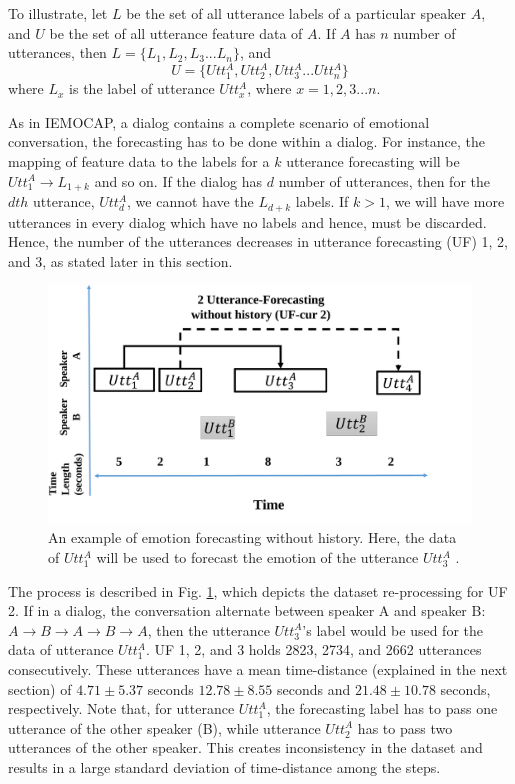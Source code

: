 To illustrate, let $L$ be the set of all utterance labels of a particular speaker $A$, and $U$ be the set of all utterance feature data of $A$. If $A$ has $n$ number of utterances, then
$L=\{L_1,L_2,L_3...L_n\}$, 
and
\[
U=\{Utt_{1}^A, Utt_{2}^A, Utt_{3}^A...Utt_{n}^A\}
\]
 where $L_x$ is the label of  utterance $Utt_{x}^A$, where $x=1,2,3...n$.

 As in IEMOCAP, a dialog contains a complete scenario of emotional conversation, the forecasting has to be done within a dialog.    For instance,  the mapping of feature data  to the labels for a $k$ utterance forecasting will be $Utt_{1}^A \rightarrow L_{1+k}$ and so on. If the dialog has $d$ number of utterances, then for the $dth$ utterance, $Utt_{d}^A$, we cannot have the $L_{d+k}$ labels. If $k>1$, we will have more utterances in every dialog which have no labels and  hence, must be discarded. Hence, the number of the utterances decreases in utterance forecasting (UF) 1, 2, and 3, as stated later in this section. 

\begin{figure}
\centering
   \includegraphics[width=0.6\linewidth]{Chapters/cur.pdf}
\caption[Two numerical solutions]{An example of emotion forecasting without history. Here, the data of $Utt_{1}^A$ will be used to forecast the emotion of the utterance $Utt_{3}^A$ .}
\label{fig:historyless}
\end{figure}

The process is described in Fig. \ref{fig:historyless}, which depicts the dataset re-processing for UF 2. If in a dialog, the conversation alternate between  speaker A and speaker B: $A \rightarrow B \rightarrow A \rightarrow B \rightarrow A$, then the utterance $Utt_{3}^A$'s label would be used for the data of utterance $Utt_{1}^A$. UF 1, 2, and 3 holds 2823, 2734, and 2662 utterances consecutively. These utterances have a mean time-distance (explained in the next section) of $4.71\pm5.37$ seconds $12.78 \pm8.55$ seconds and $21.48\pm10.78$  seconds, respectively. Note that, for utterance $Utt_{1}^A$, the forecasting label has to pass one utterance of the other speaker (B), while utterance $Utt_{2}^A$ has to pass two utterances of the other speaker. This creates inconsistency in the dataset and results in a large standard deviation of time-distance among the steps.


